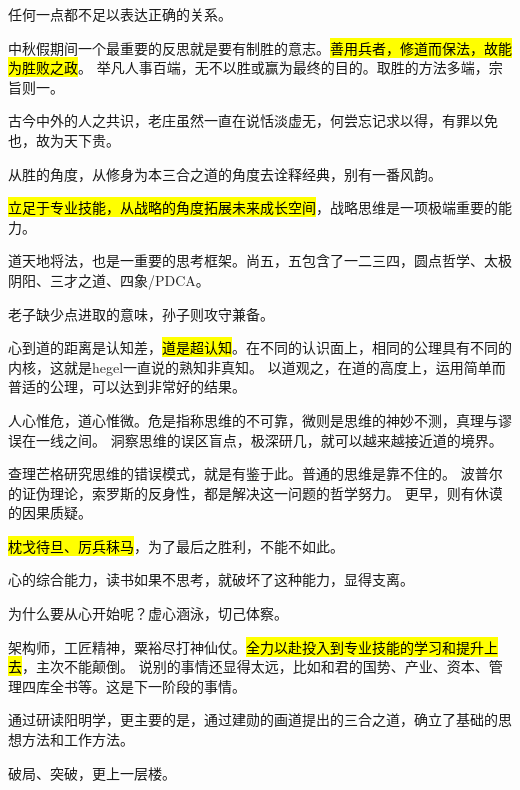 任何一点都不足以表达正确的关系。

中秋假期间一个最重要的反思就是要有制胜的意志。\hl{善用兵者，修道而保法，故能为胜败之政}。
举凡人事百端，无不以胜或赢为最终的目的。取胜的方法多端，宗旨则一。

古今中外的人之共识，老庄虽然一直在说恬淡虚无，何尝忘记求以得，有罪以免也，故为天下贵。

从胜的角度，从修身为本三合之道的角度去诠释经典，别有一番风韵。

\hl{立足于专业技能，从战略的角度拓展未来成长空间}，战略思维是一项极端重要的能力。

道天地将法，也是一重要的思考框架。尚五，五包含了一二三四，圆点哲学、太极阴阳、三才之道、四象/PDCA。

老子缺少点进取的意味，孙子则攻守兼备。

心到道的距离是认知差，\hl{道是超认知}。在不同的认识面上，相同的公理具有不同的内核，这就是hegel一直说的熟知非真知。
以道观之，在道的高度上，运用简单而普适的公理，可以达到非常好的结果。

人心惟危，道心惟微。危是指称思维的不可靠，微则是思维的神妙不测，真理与谬误在一线之间。
洞察思维的误区盲点，极深研几，就可以越来越接近道的境界。

查理芒格研究思维的错误模式，就是有鉴于此。普通的思维是靠不住的。
波普尔的证伪理论，索罗斯的反身性，都是解决这一问题的哲学努力。
更早，则有休谟的因果质疑。

\hl{枕戈待旦、厉兵秣马}，为了最后之胜利，不能不如此。

心的综合能力，读书如果不思考，就破坏了这种能力，显得支离。

为什么要从心开始呢？虚心涵泳，切己体察。

架构师，工匠精神，粟裕尽打神仙仗。\hl{全力以赴投入到专业技能的学习和提升上去}，主次不能颠倒。
说别的事情还显得太远，比如和君的国势、产业、资本、管理四库全书等。这是下一阶段的事情。

通过研读阳明学，更主要的是，通过建勋的画道提出的三合之道，确立了基础的思想方法和工作方法。

破局、突破，更上一层楼。
